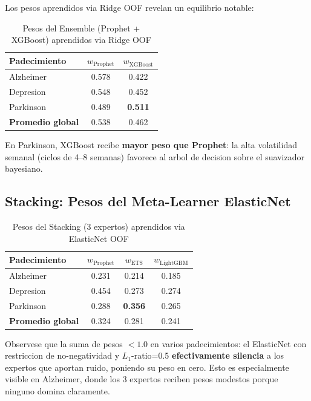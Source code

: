 \documentclass[12pt, letterpaper]{article}
\begin{document}
Los pesos aprendidos via Ridge OOF revelan un equilibrio notable:

\begin{table}[H]
\centering
\caption{Pesos del Ensemble (Prophet + XGBoost) aprendidos via Ridge OOF}
\label{tab:ensemble_weights}
\small
\begin{tabular}{lcc}
\toprule
\textbf{Padecimiento} & $w_{\text{Prophet}}$ & $w_{\text{XGBoost}}$ \\
\midrule
Alzheimer  & 0.578 & 0.422 \\
Depresion  & 0.548 & 0.452 \\
Parkinson  & 0.489 & \textbf{0.511} \\
\midrule
\textbf{Promedio global} & 0.538 & 0.462 \\
\bottomrule
\end{tabular}
\end{table}

En Parkinson, XGBoost recibe \textbf{mayor peso que Prophet}: la alta volatilidad semanal (ciclos de 4--8 semanas) favorece al arbol de decision sobre el suavizador bayesiano.

\subsection{Stacking: Pesos del Meta-Learner ElasticNet}

\begin{table}[H]
\centering
\caption{Pesos del Stacking (3 expertos) aprendidos via ElasticNet OOF}
\label{tab:stacking_weights}
\small
\begin{tabular}{lccc}
\toprule
\textbf{Padecimiento} & $w_{\text{Prophet}}$ & $w_{\text{ETS}}$ & $w_{\text{LightGBM}}$ \\
\midrule
Alzheimer  & 0.231 & 0.214 & 0.185 \\
Depresion  & 0.454 & 0.273 & 0.274 \\
Parkinson  & 0.288 & \textbf{0.356} & 0.265 \\
\midrule
\textbf{Promedio global} & 0.324 & 0.281 & 0.241 \\
\bottomrule
\end{tabular}
\end{table}

Observese que la suma de pesos $< 1.0$ en varios padecimientos: el ElasticNet con restriccion de no-negatividad y $L_1$-ratio=0.5 \textbf{efectivamente silencia} a los expertos que aportan ruido, poniendo su peso en cero. Esto es especialmente visible en Alzheimer, donde los 3 expertos reciben pesos modestos porque ninguno domina claramente.
\end{document}
